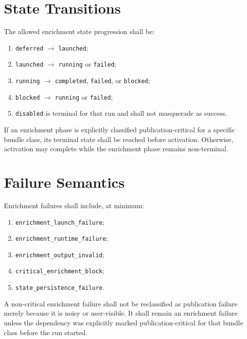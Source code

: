 \section{State Transitions}
The allowed enrichment state progression shall be:
\begin{enumerate}[leftmargin=1.2cm]
    \item \texttt{deferred} \(\rightarrow\) \texttt{launched};
    \item \texttt{launched} \(\rightarrow\) \texttt{running} or \texttt{failed};
    \item \texttt{running} \(\rightarrow\) \texttt{completed}, \texttt{failed}, or \texttt{blocked};
    \item \texttt{blocked} \(\rightarrow\) \texttt{running} or \texttt{failed};
    \item \texttt{disabled} is terminal for that run and shall not masquerade as success.
\end{enumerate}

If an enrichment phase is explicitly classified publication-critical for a specific bundle class, its terminal state shall be reached before activation. Otherwise, activation may complete while the enrichment phase remains non-terminal.

\section{Failure Semantics}
Enrichment failures shall include, at minimum:
\begin{enumerate}[leftmargin=1.2cm]
    \item \texttt{enrichment\_launch\_failure};
    \item \texttt{enrichment\_runtime\_failure};
    \item \texttt{enrichment\_output\_invalid};
    \item \texttt{critical\_enrichment\_block};
    \item \texttt{state\_persistence\_failure}.
\end{enumerate}

A non-critical enrichment failure shall not be reclassified as publication failure merely because it is noisy or user-visible. It shall remain an enrichment failure unless the dependency was explicitly marked publication-critical for that bundle class before the run started.

